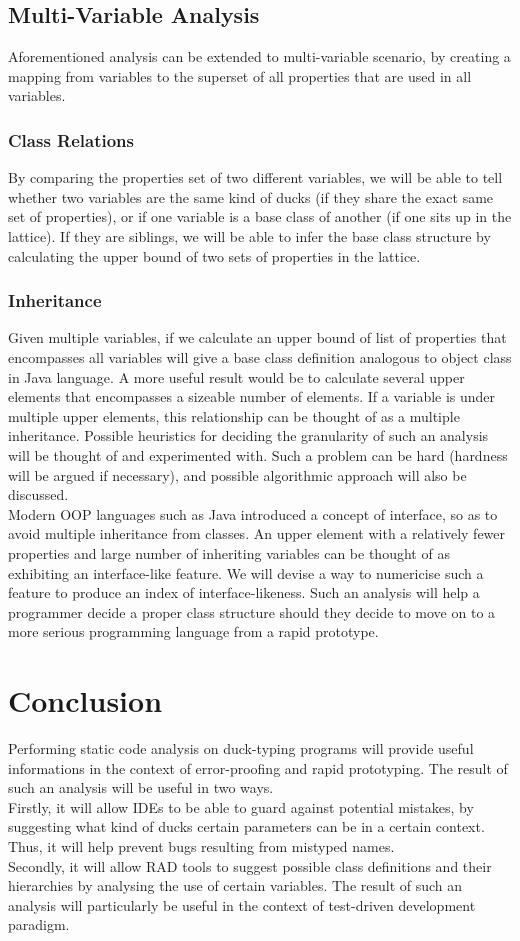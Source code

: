 \documentclass[a4paper,12pt,twocolumn]{article}
\begin{document}
\subsection{Multi-Variable Analysis}
Aforementioned analysis can be extended to multi-variable scenario, by creating a mapping from variables to the superset of all properties that are used in all variables.
\subsubsection{Class Relations}
By comparing the properties set of two different variables, we will be able to tell whether two variables are the same kind of ducks (if they share the exact same set of properties), or if one variable is a base class of another (if one sits up in the lattice). If they are siblings, we will be able to infer the base class structure by calculating the upper bound of two sets of properties in the lattice.
\subsubsection{Inheritance}
Given multiple variables, if we calculate an upper bound of list of properties that encompasses all variables will give a base class definition analogous to object class in Java language. A more useful result would be to calculate several upper elements that encompasses a sizeable number of elements. If a variable is under multiple upper elements, this relationship can be thought of as a multiple inheritance. Possible heuristics for deciding the granularity of such an analysis will be thought of and experimented with. Such a problem can be hard (hardness will be argued if necessary), and possible algorithmic approach will also be discussed.\\
Modern OOP languages such as Java introduced a concept of interface, so as to avoid multiple inheritance from classes. An upper element with a relatively fewer properties and large number of inheriting variables can be thought of as exhibiting an interface-like feature. We will devise a way to numericise such a feature to produce an index of interface-likeness. Such an analysis will help a programmer decide a proper class structure should they decide to move on to a more serious programming language from a rapid prototype.
\section{Conclusion}
Performing static code analysis on duck-typing programs will provide useful informations in the context of error-proofing and rapid prototyping. The result of such an analysis will be useful in two ways.\\ 
Firstly, it will allow IDEs to be able to guard against potential mistakes, by suggesting what kind of ducks certain parameters can be in a certain context. Thus, it will help prevent bugs resulting from mistyped names.\\
Secondly, it will allow RAD tools to suggest possible class definitions and their hierarchies by analysing the use of certain variables. The result of such an analysis will particularly be useful in the context of test-driven development paradigm.\\
\end{document}
